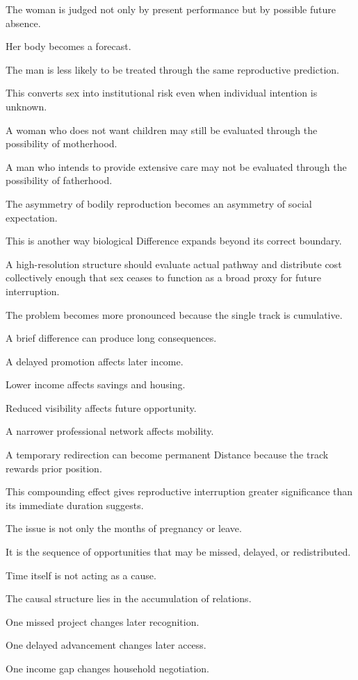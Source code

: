 The woman is judged not only by present performance but by possible future absence.

Her body becomes a forecast.

The man is less likely to be treated through the same reproductive prediction.

This converts sex into institutional risk even when individual intention is unknown.

A woman who does not want children may still be evaluated through the possibility of motherhood.

A man who intends to provide extensive care may not be evaluated through the possibility of fatherhood.

The asymmetry of bodily reproduction becomes an asymmetry of social expectation.

This is another way biological Difference expands beyond its correct boundary.

A high-resolution structure should evaluate actual pathway and distribute cost collectively enough that sex ceases to function as a broad proxy for future interruption.

The problem becomes more pronounced because the single track is cumulative.

A brief difference can produce long consequences.

A delayed promotion affects later income.

Lower income affects savings and housing.

Reduced visibility affects future opportunity.

A narrower professional network affects mobility.

A temporary redirection can become permanent Distance because the track rewards prior position.

This compounding effect gives reproductive interruption greater significance than its immediate duration suggests.

The issue is not only the months of pregnancy or leave.

It is the sequence of opportunities that may be missed, delayed, or redistributed.

Time itself is not acting as a cause.

The causal structure lies in the accumulation of relations.

One missed project changes later recognition.

One delayed advancement changes later access.

One income gap changes household negotiation.

